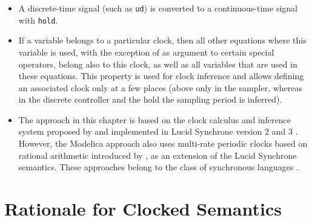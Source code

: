 \begin{itemize}
\item
  A discrete-time signal (such as \lstinline!ud!) is converted to a continuous-time signal with \lstinline!hold!.
\item
  If a variable belongs to a particular clock, then all other equations where this variable is used, with the exception of as argument to certain special operators, belong also to this clock, as well as all variables that are used in these equations.
  This property is used for clock inference and allows defining an associated clock only at a few places (above only in the sampler, whereas in the discrete controller and the hold the sampling period is inferred).
\item
  The approach in this chapter is based on the clock calculus and inference system proposed by \textcite{ColacoPouzet2003ClocksFirstClass} and implemented in Lucid Synchrone version 2 and 3 \parencite{Pouzet2006LucidSynchrone30}.
  However, the Modelica approach also uses multi-rate periodic clocks based on rational arithmetic introduced by \textcite{ForgetEtAl2008MultiPeriodic}, as an extension of the Lucid Synchrone semantics.
  These approaches belong to the class of synchronous languages \parencite{BenvenisteEtAl2003SynchronousTwelveYearsLater}.
\end{itemize}

\section{Rationale for Clocked Semantics}\label{rationale-for-clocked-semantics}

